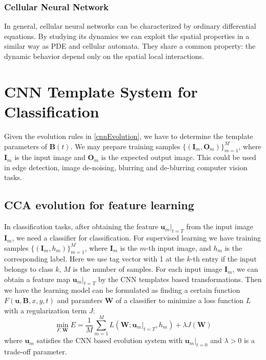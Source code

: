 \documentclass{amsart}
\theoremstyle{definition}
\theoremstyle{remark}
\numberwithin{equation}{section}
\begin{document}
\subsubsection{Cellular Neural Network}
In general, cellular neural networks can be characterized by ordinary differential equations.
By studying its dynamics we can exploit the spatial properties in a similar way as PDE and cellular automata.
They share a common property: the dynamic behavior depend only on the spatial local interactions.

\section{CNN Template System for Classification}
Given the evolution rules in \ref{cnnEvolution}, we have to determine the template parameters of $\mathbf{B}(t)$.
We may prepare training samples $\{(\mathbf{I}_m, \mathbf{O}_m)\}_{m=1}^M$, where $\mathbf{I}_m$ is the input image and $\mathbf{O}_m$ is the expected output image. This could be used in edge detection, image de-noising,  blurring and de-blurring computer vision tasks.


\subsection{CCA evolution for feature learning}
In classification tasks, after obtaining the feature $\mathbf{u}_m|_{t=T}$ from the input image $\mathbf{I}_m$, we need a classifier for classification.
For supervised learning we have training samples $\{(\mathbf{I}_m, h_m)\}_{m=1}^M$, where $\mathbf{I}_m$ is the $m$-th input image, and $h_m$ is the corresponding label. Here we use tag vector with 1 at the $k$-th entry if the input belongs to class $k$, $M$ is the number of samples.
For each input image $\mathbf{I}_m$, we can obtain a feature map $\mathbf{u}_m|_{t=T}$ by the CNN templates based transformations.
Then we have the learning model can be formulated as finding a certain function $F(\mathbf{u},  \mathbf{B}, x, y, t)$ and paramters $\mathbf{W}$ of a classifier to minimize a loss function $L$ with a regularization term $J$:
\begin{equation}
\label{lossfunc}
\min_{F, \mathbf{W}} E = \frac{1}{M} \sum_{m=1}^M L(\mathbf{W}; \mathbf{u}_m|_{t=T}, h_m) + \lambda J(\mathbf{W})
\end{equation}
where $\mathbf{u}_m$ satisfies the CNN based evolution system with $\mathbf{u}_m|_{t=0}$ and $\lambda > 0$ is a trade-off parameter.
\end{document}
